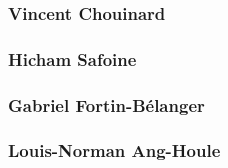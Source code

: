 \documentclass[10pt,a4paper,final]{article}
\begin{document}
\begin{spacing}{1.5}
\subsubsection{Vincent Chouinard}

\subsubsection{Hicham Safoine}

\subsubsection{Gabriel Fortin-Bélanger}

\subsubsection{Louis-Norman Ang-Houle}
\end{spacing}
\end{document}
